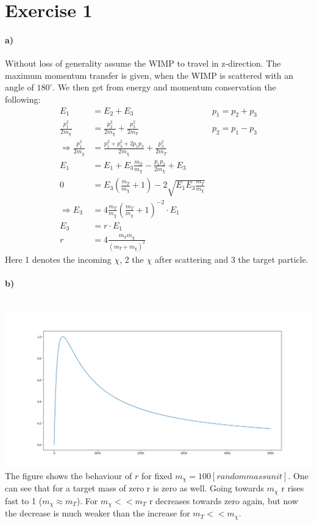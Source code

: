 \documentclass[10pt,a4paper]{article}
\begin{document}
\section*{Exercise 1}
\paragraph*{a)}
Without loss of generality assume the WIMP to travel in z-direction. The maximum momentum transfer is given, when the WIMP is scattered with an angle of $180^\circ$. We then get from energy and momentum conservation the following:
\begin{align*}
E_1 &= E_2 + E_3 & p_1 = p_2 + p_3\\
\frac{p_1^2}{2m_\chi} &= \frac{p_2^2}{2m_\chi} + \frac{p_3^2}{2m_T} & p_2 = p_1 - p_3 \\
\Rightarrow 
\frac{p_1^2}{2m_\chi} &= \frac{p_1^2 + p_3^2 + 2 p_1 p_3}{2m_\chi} + \frac{p_3^2}{2m_T} \\
E_1 &= E_1 + E_3 \frac{m_T}{m_\chi} - \frac{p_1 p_3}{2 m_\chi} + E_3 \\
0 &= E_3 (\frac{m_T}{m_\chi} + 1) - 2 \sqrt{E_1 E_3 \frac{m_T}{m_\chi}} \\
\Rightarrow
E_3 &= 4 \frac{m_T}{m_\chi} (\frac{m_T}{m_\chi}+1)^{-2} \cdot E_1 \\
E_3 &= r \cdot E_1 \\
r &= 4 \frac{m_T m_\chi}{(m_T+m_\chi)^2}
\end{align*}
Here 1 denotes the incoming $\chi$, 2 the $\chi$ after scattering and 3 the target particle.
\paragraph{b)} \ \\
\includegraphics[width=\textwidth]{exercise1b.png}
The figure shows the behaviour of $r$ for fixed $m_\chi = 100 [random mass unit]$. One can see that for a target mass of zero r is zero as well. Going towards $m_\chi$ r rises fast to 1 ($m_\chi \approx m_T$). For $m_\chi << m_T$ r decreases towards zero again, but now the decrease is much weaker than the increase for $m_T << m_\chi$.
\end{document}
